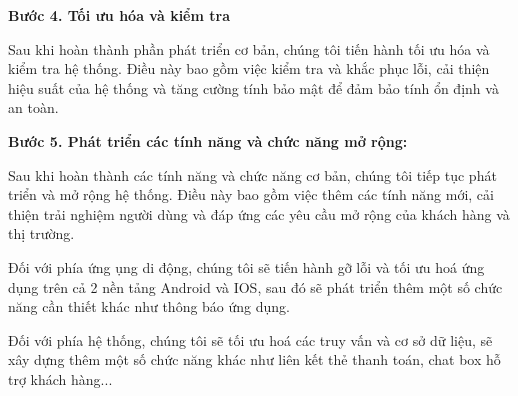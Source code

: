 \textbf{Bước 4. Tối ưu hóa và kiểm tra}

Sau khi hoàn thành phần phát triển cơ bản, chúng tôi tiến hành tối ưu hóa và kiểm tra hệ thống. Điều này bao gồm việc kiểm tra và khắc phục lỗi, cải thiện hiệu suất của hệ thống và tăng cường tính bảo mật để đảm bảo tính ổn định và an toàn.

\textbf{Bước 5. Phát triển các tính năng và chức năng mở rộng:}

Sau khi hoàn thành các tính năng và chức năng cơ bản, chúng tôi tiếp tục phát triển và mở rộng hệ thống. Điều này bao gồm việc thêm các tính năng mới, cải thiện trải nghiệm người dùng và đáp ứng các yêu cầu mở rộng của khách hàng và thị trường.

Đối với phía ứng ụng di động, chúng tôi sẽ tiến hành gỡ lỗi và tối ưu hoá ứng dụng trên cả 2 nền tảng Android và IOS, sau đó sẽ phát triển thêm một số chức năng cần thiết khác như thông báo ứng dụng.

Đối với phía hệ thống, chúng tôi sẽ tối ưu hoá các truy vấn và cơ sở dữ liệu, sẽ xây dựng thêm một số chức năng khác như liên kết thẻ thanh toán, chat box hỗ trợ khách hàng...


